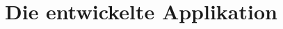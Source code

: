 \documentclass[../main.tex]{subfiles}
\begin{document}
\section{Die entwickelte Applikation}%
\end{document}

